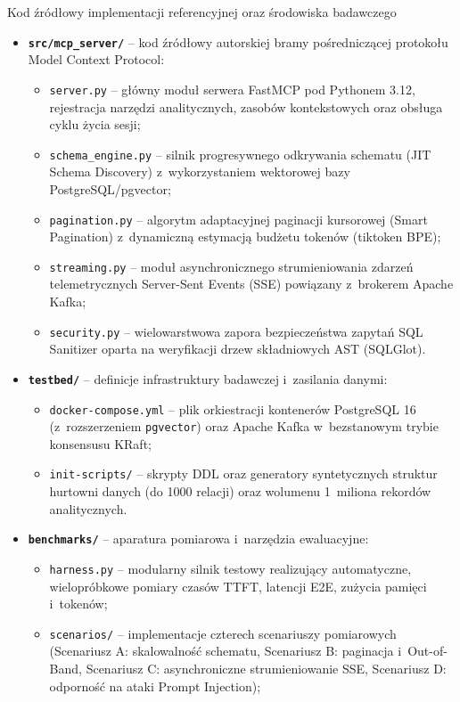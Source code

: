 \begin{easyappendix}{Kod źródłowy implementacji referencyjnej oraz środowiska badawczego}
\begin{itemize}
    \item \textbf{\texttt{src/mcp\_server/}} -- kod źródłowy autorskiej bramy pośredniczącej protokołu Model Context Protocol:
    \begin{itemize}
        \item \texttt{server.py} -- główny moduł serwera FastMCP pod Pythonem 3.12, rejestracja narzędzi analitycznych, zasobów kontekstowych oraz obsługa cyklu życia sesji;
        \item \texttt{schema\_engine.py} -- silnik progresywnego odkrywania schematu (JIT Schema Discovery) z~wykorzystaniem wektorowej bazy PostgreSQL/pgvector;
        \item \texttt{pagination.py} -- algorytm adaptacyjnej paginacji kursorowej (Smart Pagination) z~dynamiczną estymacją budżetu tokenów (tiktoken BPE);
        \item \texttt{streaming.py} -- moduł asynchronicznego strumieniowania zdarzeń telemetrycznych Server-Sent Events (SSE) powiązany z~brokerem Apache Kafka;
        \item \texttt{security.py} -- wielowarstwowa zapora bezpieczeństwa zapytań SQL Sanitizer oparta na weryfikacji drzew składniowych AST (SQLGlot).
    \end{itemize}
    \item \textbf{\texttt{testbed/}} -- definicje infrastruktury badawczej i~zasilania danymi:
    \begin{itemize}
        \item \texttt{docker-compose.yml} -- plik orkiestracji kontenerów PostgreSQL 16 (z~rozszerzeniem \texttt{pgvector}) oraz Apache Kafka w~bezstanowym trybie konsensusu KRaft;
        \item \texttt{init-scripts/} -- skrypty DDL oraz generatory syntetycznych struktur hurtowni danych (do 1000 relacji) oraz wolumenu 1~miliona rekordów analitycznych.
    \end{itemize}
    \item \textbf{\texttt{benchmarks/}} -- aparatura pomiarowa i~narzędzia ewaluacyjne:
    \begin{itemize}
        \item \texttt{harness.py} -- modularny silnik testowy realizujący automatyczne, wielopróbkowe pomiary czasów TTFT, latencji E2E, zużycia pamięci i~tokenów;
        \item \texttt{scenarios/} -- implementacje czterech scenariuszy pomiarowych (Scenariusz A: skalowalność schematu, Scenariusz B: paginacja i~Out-of-Band, Scenariusz C: asynchroniczne strumieniowanie SSE, Scenariusz D: odporność na ataki Prompt Injection);

\end{itemize}
\end{itemize}
\end{easyappendix}
